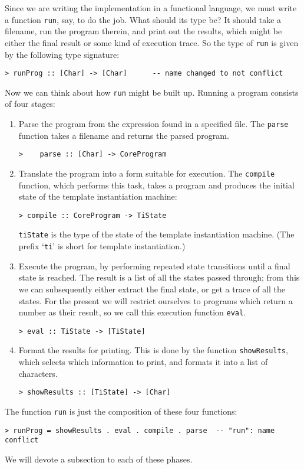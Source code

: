 Since we are writing the implementation in a functional language,
we must write a function \mbox{\tt run}, say,
to do the job.  What should its type be?
It should take a filename, run the program therein, and print
out the results, which might be either the final result or some kind
of execution trace.
So the type of \mbox{\tt run} is given by the following type signature:
\begin{verbatim}
> runProg :: [Char] -> [Char]      -- name changed to not conflict
\end{verbatim}
%
\par
Now we can think about how \mbox{\tt run} might be built up.  Running a program
consists of four stages:
\begin{enumerate}
\item
Parse the program from the expression found in a specified file.
The \mbox{\tt parse} function takes a filename and returns the parsed program.
\begin{verbatim}
>    parse :: [Char] -> CoreProgram
\end{verbatim}
\item
Translate the program
into a form suitable for execution.  The \mbox{\tt compile} function,
which performs this task, takes a program and
produces the initial state of the template instantiation machine:
\begin{verbatim}
> compile :: CoreProgram -> TiState
\end{verbatim}
%
\mbox{\tt tiState} is the type of the state of the template instantiation machine.
(The prefix `\mbox{\tt ti}' is short for template instantiation.)
\item
Execute the program, by performing repeated state transitions until
a final state is reached.  The result is a list of all the states passed
through; from this we can subsequently
either extract the final state, or get a trace
of all the states.
For the present we will restrict ourselves to programs which return
a number as their result, so we call this execution function \mbox{\tt eval}.
\begin{verbatim}
> eval :: TiState -> [TiState]
\end{verbatim}
%
\item
Format the results for printing.  This is done by the function \mbox{\tt showResults},
which selects which information to print, and formats it into a
list of characters.
\begin{verbatim}
> showResults :: [TiState] -> [Char]
\end{verbatim}
%
\end{enumerate}
The function \mbox{\tt run} is just the composition of these four functions:
\begin{verbatim}
> runProg = showResults . eval . compile . parse  -- "run": name conflict
\end{verbatim}
%
We will devote a subsection to each of these phases.


